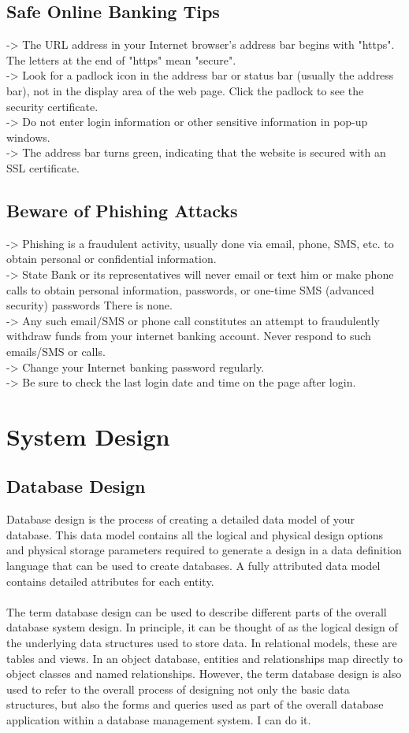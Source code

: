 \documentclass{article}
\begin{document}
\subsection{Safe Online Banking Tips}
-> The URL address in your Internet browser's address bar begins with "https". The letters at the end of "https" mean "secure".\\ \hfill \break -> Look for a padlock icon in the address bar or status bar (usually the address bar), not in the display area of the web page. Click the padlock to see the security certificate.\\ \hfill \break -> Do not enter login information or other sensitive information in pop-up windows.\\ \hfill \break -> The address bar turns green, indicating that the website is secured with an SSL certificate.
\subsection{Beware of Phishing Attacks }
-> Phishing is a fraudulent activity, usually done via email, phone, SMS, etc. to obtain personal or confidential information.\\ \hfill \break -> State Bank or its representatives will never email or text him or make phone calls to obtain personal information, passwords, or one-time SMS (advanced security) passwords There is none.\\ \hfill \break -> Any such email/SMS or phone call constitutes an attempt to fraudulently withdraw funds from your internet banking account. Never respond to such emails/SMS or calls.\\ \hfill \break -> Change your Internet banking password regularly.\\ \hfill \break -> Be sure to check the last login date and time on the page after login.
\newpage
\section{System Design }
\subsection{Database Design }
Database design is the process of creating a detailed data model of your database. This data model contains all the logical and physical design options and physical storage parameters required to generate a design in a data definition language that can be used to create databases. A fully attributed data model contains detailed attributes for each entity.\\\\
The term database design can be used to describe different parts of the overall database system design. In principle, it can be thought of as the logical design of the underlying data structures used to store data. In relational models, these are tables and views. In an object database, entities and relationships map directly to object classes and named relationships. However, the term database design is also used to refer to the overall process of designing not only the basic data structures, but also the forms and queries used as part of the overall database application within a database management system. I can do it. 
\newpage
\end{document}

